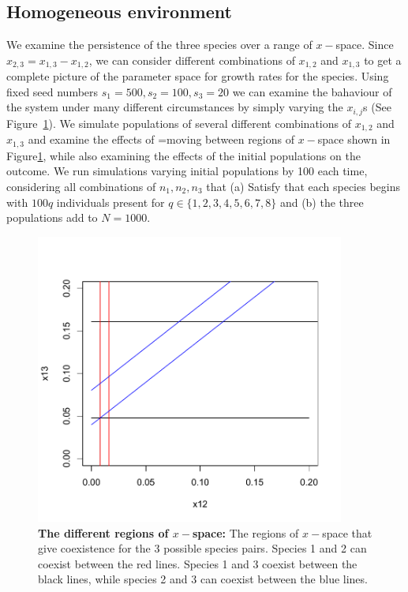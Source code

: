 \subsection{Homogeneous environment}
We examine the persistence of the three species over a range of $x-$space. Since $x_{2,3}=x_{1,3}-x_{1,2}$, we can consider different combinations of 
$x_{1,2}$ and $x_{1,3}$ to get a complete picture of the parameter space for growth rates for the species. Using fixed seed numbers $s_1=500,s_2=100,s_3=20$ we can examine the bahaviour of the system under many different circumstances by simply varying the $x_{i,j}$s (See Figure~\ref{xregions}). We simulate populations of several different combinations of $x_{1,2}$ and $x_{1,3}$ and examine the effects of =moving between regions of $x-$space shown in Figure\ref{xregions}, while also examining the effects of the initial populations on the outcome. We run simulations varying initial populations by 100 each time, considering all combinations of $n_1,n_2,n_3$ that (a) Satisfy that each species begins with $100q$ individuals present for $q \in \{1,2,3,4,5,6,7,8\}$ and (b) the three populations add to $N=1000$. 
\begin{figure}[htbp]
\begin{center}
\includegraphics[width=4in]{3dxchoices.pdf}
\caption[The different regions of $x-$space]{\textbf{The different regions of $x-$space:} The regions of $x-$space that give coexistence for the 3 possible species pairs. Species 1 and 2 can coexist between the red lines. Species 1 and 3 coexist between the black lines, while species 2 and 3 can coexist between the blue lines.}
\label{xregions}
\end{center}
\end{figure}
